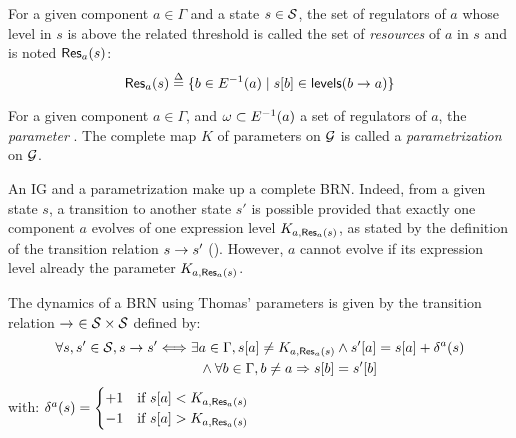 \begin{definition}\label{def:resources}
For a given component $a \in \Gamma$ and a state $s \in \mathcal{S}$,
the set of regulators of $a$ whose level in $s$ is above the related threshold %
is called the set of \emph{resources} of $a$ in $s$ and is noted $\mathsf{Res}_{a}(s)$:
$$\mathsf{Res}_{a}(s) \stackrel{\Delta}= \{ b \in E^{-1}(a) \mid {s[b]} \in \mathsf{levels}(b\rightarrow a) \}$$
\end{definition}

\begin{definition}\label{def:param}
For a given component $a \in \Gamma$, and $\omega \subset E^{-1}(a)$ a set of regulators of $a$,
the \emph{parameter} .
The complete map $K$ of parameters on $\mathcal{G}$ is called a \emph{parametrization} on $\mathcal{G}$.
\end{definition}

An IG and a parametrization make up a complete BRN.
Indeed, from a given state $s$, a transition to another state $s'$ is possible provided that
exactly one component $a$ evolves of one expression level  $K_{a,\mathsf{Res}_{a}(s)}$,
as stated by the definition of the transition relation $s \rightarrow s'$ ().
However, $a$ cannot evolve if its expression level already 
the parameter $K_{a,\mathsf{Res}_{a}(s)}$.

\begin{definition}\label{def:dynamics}
The dynamics of a BRN using Thomas' parameters is given by the transition relation $\rightarrow\ \in \mathcal{S} \times \mathcal{S}$ defined by:
\begin{align*}
  \forall s, s' \in \mathcal{S}, s \rightarrow s' &\Longleftrightarrow \exists a \in \Gamma,
  {s[a]} \neq K_{a, \mathsf{Res}_{a}(s)} \wedge {s'[a]} = {s[a]} + \delta^a(s) \\
    & \qquad\quad \wedge \forall b \in \Gamma, b \neq a \Rightarrow {s[b]} = {s'[b]}
\end{align*}
with: $\delta^a(s) =
  \begin{cases}
    +1 & \text{if } {s[a]} < K_{a, \mathsf{Res}_{a}(s)} \\
    -1 & \text{if } {s[a]} > K_{a, \mathsf{Res}_{a}(s)} \\
  \end{cases}$
\end{definition}


